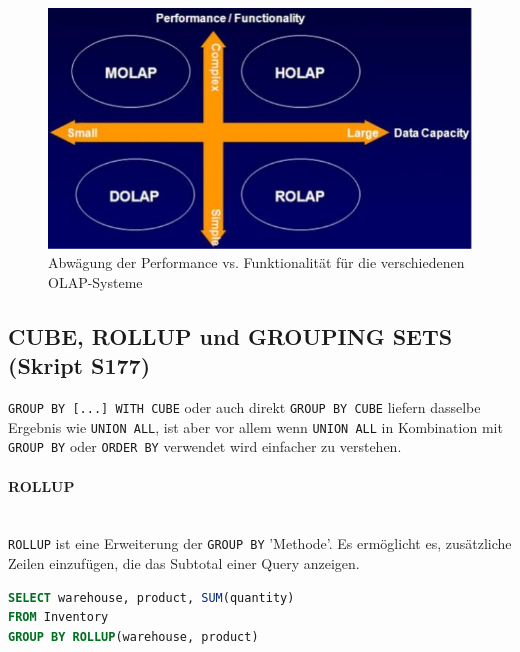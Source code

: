 \documentclass[a4paper, 11pt, nofootinbib]{article}
\newcommand{\code}[1]{\texttt{#1}}
\begin{document}
\begin{figure}[htb!]
	\centering
	\includegraphics[keepaspectratio=true,height=11\baselineskip]{performance_vs_functionality.jpg}
	\caption{Abwägung der Performance vs. Funktionalität für die verschiedenen OLAP-Systeme}
	\label{fig:performance_functionality}
\end{figure}

\newpage

\subsection{CUBE, ROLLUP und GROUPING SETS (Skript S177)}
\code{GROUP BY [...] WITH CUBE} oder auch direkt \code{GROUP BY CUBE} liefern dasselbe Ergebnis wie \code{UNION ALL}, ist aber vor allem wenn \code{UNION ALL} in Kombination mit \code{GROUP BY} oder \code{ORDER BY} verwendet wird einfacher zu verstehen.

\paragraph{ROLLUP}\mbox{}\\
\code{ROLLUP} ist eine Erweiterung der \code{GROUP BY} 'Methode'. Es ermöglicht es, zusätzliche Zeilen einzufügen, die das Subtotal einer Query anzeigen.

\begin{lstlisting}[language=sql, captionpos = b, caption={Beispiel der Nutzung von ROLLUP}]
SELECT warehouse, product, SUM(quantity)
FROM Inventory
GROUP BY ROLLUP(warehouse, product)
\end{lstlisting}
\end{document}
